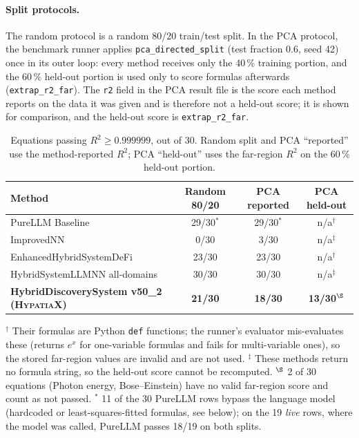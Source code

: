 \documentclass[twoside,11pt]{article}
\newcommand{\Rsq}{R^{2}}
\begin{document}
\paragraph{Split protocols.} The random protocol is a random 80/20
train/test split. In the PCA protocol, the benchmark runner applies
\texttt{pca\_directed\_split} (test fraction 0.6, seed 42) once in its outer loop:
every method receives only the 40\,\% training portion, and the 60\,\% held-out portion is used
only to score formulas afterwards (\texttt{extrap\_r2\_far}). The \texttt{r2} field in the PCA result file
is the score each method reports on the data it was given and is therefore not a held-out score; it is
shown for comparison, and the held-out score is \texttt{extrap\_r2\_far}.

\begin{table}[h]
\centering
\caption{Equations passing $\Rsq \geq 0.999999$, out of 30. Random split and PCA ``reported'' use the
  method-reported $\Rsq$; PCA ``held-out'' uses the far-region $\Rsq$ on the 60\,\% held-out portion.
}
\label{tab:feynman30-methods}
\small
\begin{tabular}{lccc}
\toprule
Method & Random 80/20 & PCA reported & PCA held-out \\
\midrule
PureLLM Baseline & 29/30$^\ast$ & 29/30$^\ast$ & n/a$^\dagger$ \\
ImprovedNN & 0/30 & 3/30 & n/a$^\ddagger$ \\
EnhancedHybridSystemDeFi & 23/30 & 23/30 & n/a$^\dagger$ \\
HybridSystemLLMNN all-domains & 30/30 & 30/30 & n/a$^\ddagger$ \\
\textbf{HybridDiscoverySystem v50\_2 (\textsc{HypatiaX})} & \textbf{21/30} & \textbf{18/30} & \textbf{13/30}$^\S$ \\
\bottomrule
\end{tabular}

{\footnotesize $^\dagger$ Their formulas are Python \texttt{def} functions; the runner's evaluator
mis-evaluates these (returns $e^{x}$ for one-variable formulas and fails for multi-variable ones), so the
stored far-region values are invalid and are not used. $^\ddagger$ These methods return no formula string, so the held-out score cannot be recomputed.
$^\S$ 2 of 30 equations (Photon energy, Bose--Einstein) have no valid far-region score and count as not passed.
$^\ast$ 11 of the 30 PureLLM rows bypass the language model (hardcoded or least-squares-fitted formulas, see below); on the 19 \emph{live} rows, where the model was called, PureLLM passes 18/19 on both splits.}
\end{table}
\end{document}
